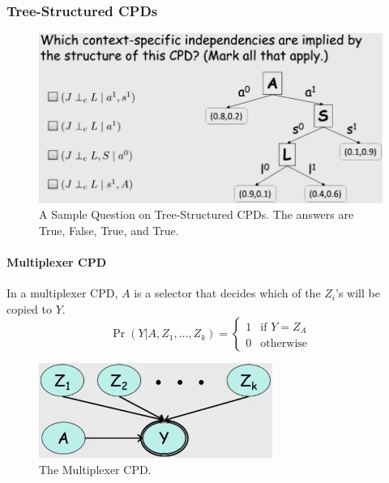 \documentclass[12pt]{article}
\begin{document}
\subsubsection{Tree-Structured CPDs}

\begin{figure}[H]
\centering
\includegraphics[width=6in]{graphics/example_tree_structured_cpds.png}
\caption{A Sample Question on Tree-Structured CPDs.  The answers are True, False, True, and True.}
\label{fig:example_tree_structured_cpds}
\end{figure}

\paragraph{Multiplexer CPD}

In a multiplexer CPD, $A$ is a selector that decides which of the $Z_i$'s will be copied to $Y$.
\begin{equation*}
  \Pr(Y | A, Z_1, \ldots, Z_k) = 
    \begin{cases}
    1 & \text{if } Y = Z_A \\
    0 & \text{otherwise}
    \end{cases}
\end{equation*}

\begin{figure}[H]
\centering
\includegraphics[width=3in]{graphics/multiplexer_cpd.png}
\caption{The Multiplexer CPD.}
\label{fig:multiplexer_cpd}
\end{figure}
\end{document}

